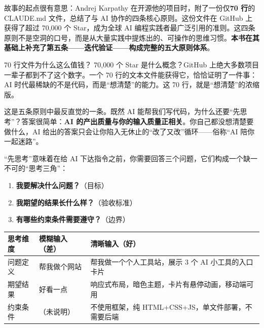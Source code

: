 

故事的起点很有意思：Andrej Karpathy 在开源他的项目时，附了一份仅\textbf{70 行}的 CLAUDE.md 文件，总结了与 AI 协作的四条核心原则。这份文件在 GitHub 上获得了超过 70,000 个 Star，成为全球 AI 编程实践者最广泛引用的准则。这四条原则不是空洞的口号，而是从大量实践中提炼出的、可操作的思维习惯。\textbf{本书在其基础上补充了第五条——迭代验证——构成完整的五大原则体系}。

\begin{tcbinfo}{70 行文件为什么这么值钱？}
70,000 个 Star 是什么概念？GitHub 上绝大多数项目一辈子都到不了这个数字。一个 70 行的文本文件能获得它，恰恰证明了一件事：AI 时代最稀缺的不是代码，而是“想清楚”的能力。这 70 行，就是“想清楚”的浓缩版。

\end{tcbinfo}


这是五条原则中最反直觉的一条。既然 AI 能帮我们写代码，为什么还要“先思考”？答案很简单：\textbf{AI 的产出质量与你的输入质量正相关}。你自己都没想清楚要做什么，AI 给出的答案只会让你陷入无休止的“改了又改”循环——俗称“AI 陪你一起迷路”。

“先思考”意味着在给 AI 下达指令之前，你需要回答三个问题，它们构成一个缺一不可的“思考三角”：

\begin{enumerate}
  \item \textbf{我要解决什么问题？}（目标）
  \item \textbf{我期望的结果长什么样？}（验收标准）
  \item \textbf{有哪些约束条件需要遵守？}（边界）
\end{enumerate}

\begin{center}
\begin{tabularx}{\linewidth}{|X|X|X|}
\hline
\textbf{思考维度} & \textbf{模糊输入（差）} & \textbf{清晰输入（好）} \tabularnewline
\hline
问题定义 & 帮我做个网站 & 帮我做一个个人工具站，展示 3 个 AI 小工具的入口卡片 \tabularnewline
期望结果 & 好看一点 & 响应式布局，暗色主题，卡片有悬停动画，移动端可用 \tabularnewline
约束条件 & （未说明） & 不使用框架，纯 HTML+CSS+JS，单文件部署，不需要后端 \tabularnewline
\hline
\end{tabularx}
\end{center}

